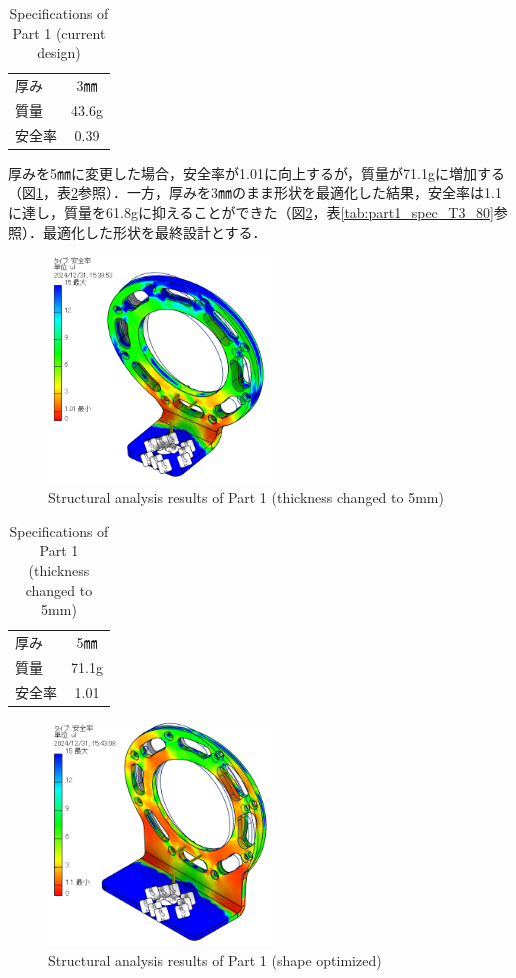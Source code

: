 \begin{table}[h]
  \centering
  \caption{Specifications of Part 1 (current design)}
  \begin{tabular}{lc}
    \hline
    厚み & 3㎜ \\ 
    質量 & 43.6g \\ 
    安全率 & 0.39 \\ \hline
  \end{tabular}
  \label{tab:part1_spec}
\end{table}

厚みを5㎜に変更した場合，安全率が1.01に向上するが，質量が71.1gに増加する（図\ref{fig:T5}，表\ref{tab:part1_spec_T5}参照）．一方，厚みを3㎜のまま形状を最適化した結果，安全率は1.1に達し，質量を61.8gに抑えることができた（図\ref{fig:T3_80}，表\ref{tab:part1_spec_T3_80}参照）．最適化した形状を最終設計とする．

\begin{figure}[h]
  \centering
  \includegraphics[width=6cm]{images/design/T5.png}
  \caption{Structural analysis results of Part 1 (thickness changed to 5mm)}
  \label{fig:T5}
\end{figure}

\begin{table}[h]
  \centering
  \caption{Specifications of Part 1 (thickness changed to 5mm)}
  \begin{tabular}{lc}
    \hline
    厚み & 5㎜ \\ 
    質量 & 71.1g \\ 
    安全率 & 1.01 \\ \hline
  \end{tabular}
  \label{tab:part1_spec_T5}
\end{table}

\begin{figure}[h]
  \centering
  \includegraphics[width=6cm]{images/design/T3_80.png}
  \caption{Structural analysis results of Part 1 (shape optimized)}
  \label{fig:T3_80}
\end{figure}

